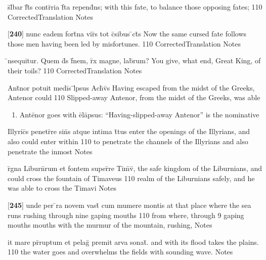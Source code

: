 \latline
  {s\={}l\={}bar f\={}t\={\macron {\i}}s contr\={}ria f\={}ta repend\={}ns;}
  { with this fate, to balance those opposing fates; }
  {110}
  { CorrectedTranslation }
  { Notes }


\latline
  {[\textbf{240}] nunc eadem fort\={}na vir\={}s tot c\={}sibus \={}ct\={}s}
  { Now the same cursed fate follows those men having been led by misfortunes. }
  {110}
  { CorrectedTranslation }
  { Notes }


\latline
  {\={\macron {\i}}nsequitur.  Quem d\={}s f\={\macron {\i}}nem, r\={}x magne, lab\={}rum?}
  { You give, what end, Great King, of their toils? }
  {110}
  { CorrectedTranslation }
  { Notes }


\latline
  {Ant\={}nor potuit medi\={\macron {\i}}s \={}l\={}psus Ach\={\macron {\i}}v\={\macron {\i}}s}
  { Having escaped from the midst of the Greeks, Antenor could }
  {110}
  { Slipped-away Antenor, from the midst of the Greeks, was able  }
  { \begin{enumerate}
  	\item Ant\={e}nor goes with \={e}l\={a}psus:  ``Having-slipped-away Antenor'' is the nominative
  \end{enumerate} }


\latline
  {Illyric\={}s penetr\={}re sin\={}s atque intima t\={}tus}
  { enter the openings of the Illyrians, and also could enter within }
  {110}
  { to penetrate the channels of the Illyrians and also penetrate the inmost  }
  { Notes }


\latline
  {r\={}gna Liburn\={}rum et fontem super\={}re Tim\={}v\={\macron {\i}},}
  { the safe kingdom of the Liburnians, and could cross the fountain of Timaveus }
  {110}
  { realm of the Liburnians safely, and he was able to cross the Timavi }
  { Notes }


\latline
  {[\textbf{245}] unde per \={}ra novem vast\={} cum mumere montis}
  { at that place where the sea runs rushing through nine gaping mouths }
  {110}
  { from where, through 9 gaping mouths mouths with the murmur of the mountain, rushing,  }
  { Notes }


\latline
  {it mare pr\={}ruptum et pelag\={} premit arva sonat\={\macron {\i}}.}
  { and with its flood takes the plains. }
  {110}
  { the water goes and overwhelms the fields with sounding wave. }
  { Notes }


